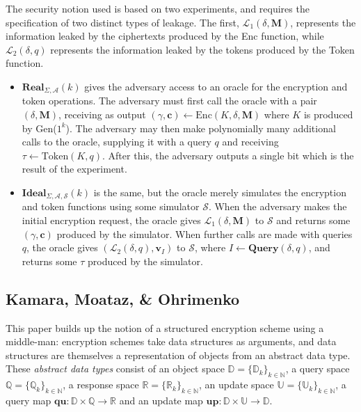 \documentclass[11pt, pdftex]{article}
\begin{document}
The security notion used is based on two experiments, and requires the specification of two distinct types of leakage. The first, $\mathcal{L}_1(\delta,\mathbf{M})$, represents the information leaked by the ciphertexts produced by the Enc function, while $\mathcal{L}_2(\delta,q)$ represents the information leaked by the tokens produced by the Token function.
\begin{itemize}
	\item $\mathbf{Real}_{\Sigma,\mathcal{A}}(k)$ gives the adversary access to an oracle for the encryption and token operations. The adversary must first call the oracle with a pair $(\delta,\mathbf{M})$, receiving as output $(\gamma,\mathbf{c}) \gets \mathrm{Enc}(K,\delta,\mathbf{M})$ where $K$ is produced by Gen($1^k$). The adversary may then make polynomially many additional calls to the oracle, supplying it with a query $q$ and receiving $\tau \gets \mathrm{Token}(K,q)$. After this, the adversary outputs a single bit which is the result of the experiment.
	\item $\mathbf{Ideal}_{\Sigma,\mathcal{A},\mathcal{S}}(k)$ is the same, but the oracle merely simulates the encryption and token functions using some simulator $\mathcal{S}$. When the adversary makes the initial encryption request, the oracle gives $\mathcal{L}_1(\delta,\mathbf{M})$ to $\mathcal{S}$ and returns some $(\gamma,\mathbf{c})$ produced by the simulator. When further calls are made with queries $q$, the oracle gives $(\mathcal{L}_2(\delta,q),\mathbf{v}_I)$ to $\mathcal{S}$, where $I \gets \mathbf{Query}(\delta,q)$, and returns some $\tau$ produced by the simulator.
\end{itemize}

\subsection{Kamara, Moataz, \& Ohrimenko}

This paper\cite{str_enc_leak} builds up the notion of a structured encryption scheme using a middle-man: encryption schemes take data structures as arguments, and data structures are themselves a representation of objects from an abstract data type. These {\em abstract data types} consist of an object space $\mathbb{D} = \{\mathbb{D}_k\}_{k \in \mathbb{N}}$, a query space $\mathbb{Q} = \{\mathbb{Q}_k\}_{k \in \mathbb{N}}$, a response space $\mathbb{R} = \{\mathbb{R}_k\}_{k \in \mathbb{N}}$, an update space $\mathbb{U} = \{\mathbb{U}_k\}_{k \in \mathbb{N}}$, a query map $\mathbf{qu}: \mathbb{D} \times \mathbb{Q} \to \mathbb{R}$ and an update map $\mathbf{up}: \mathbb{D} \times \mathbb{U} \to \mathbb{D}$.
\end{document}
